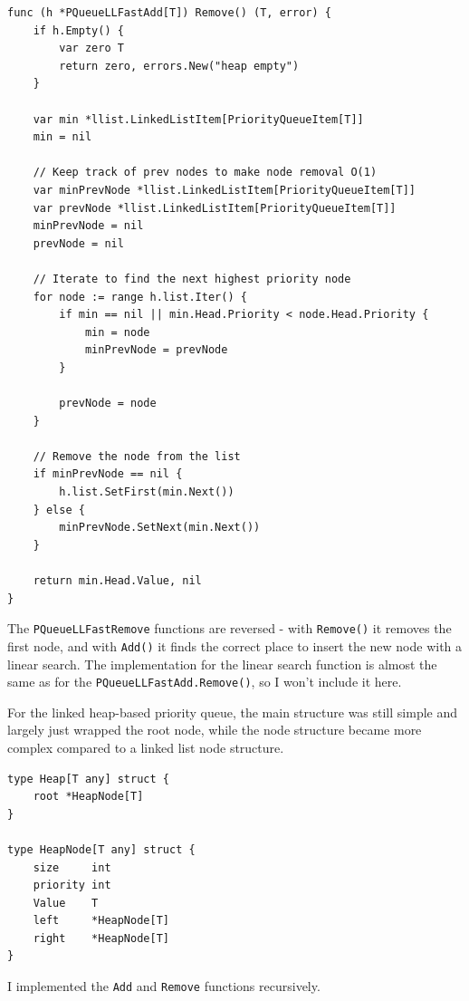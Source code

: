 \documentclass[a4paper,11pt]{article}
\begin{document}
    \begin{verbatim}
func (h *PQueueLLFastAdd[T]) Remove() (T, error) {
    if h.Empty() {
        var zero T
        return zero, errors.New("heap empty")
    }

    var min *llist.LinkedListItem[PriorityQueueItem[T]]
    min = nil

    // Keep track of prev nodes to make node removal O(1)
    var minPrevNode *llist.LinkedListItem[PriorityQueueItem[T]]
    var prevNode *llist.LinkedListItem[PriorityQueueItem[T]]
    minPrevNode = nil
    prevNode = nil

    // Iterate to find the next highest priority node
    for node := range h.list.Iter() {
        if min == nil || min.Head.Priority < node.Head.Priority {
            min = node
            minPrevNode = prevNode
        }

        prevNode = node
    }

    // Remove the node from the list
    if minPrevNode == nil {
        h.list.SetFirst(min.Next())
    } else {
        minPrevNode.SetNext(min.Next())
    }

    return min.Head.Value, nil
}        
    \end{verbatim}

    The \texttt{PQueueLLFastRemove} functions are reversed - with \texttt{Remove()} it removes the first node, and with \texttt{Add()} it finds the correct place to insert the new node with a linear search. The implementation for the linear search function is almost the same as for the \texttt{PQueueLLFastAdd.Remove()}, so I won't include it here.

    For the linked heap-based priority queue, the main structure was still simple and largely just wrapped the root node, while the node structure became more complex compared to a linked list node structure.

    \begin{verbatim}
type Heap[T any] struct {
    root *HeapNode[T]
}

type HeapNode[T any] struct {
    size     int
    priority int
    Value    T
    left     *HeapNode[T]
    right    *HeapNode[T]
}
    \end{verbatim}

    I implemented the \texttt{Add} and \texttt{Remove} functions recursively.
\end{document}

